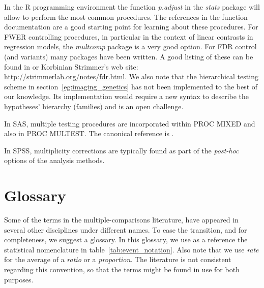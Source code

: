 \documentclass[review,12pt]{article}
\begin{document}
In the R programming environment \citep{r_development_core_team_r:_2011} the function \emph{p.adjust} in the \emph{stats} package will allow to perform the most common procedures. The references in the function documentation are a good starting point for learning about these procedures. 
For FWER controlling procedures, in particular in the context of linear contrasts in regression models, the \emph{multcomp} package is a very good option. 
For FDR control (and variants) many packages have been written. A good listing of these can be found in \citet{bretz_multiple_2010} or Korbinian Strimmer's web site: \url{http://strimmerlab.org/notes/fdr.html}. 
We also note that the hierarchical testing scheme in section~\ref{eg:imaging_genetics} has not been implemented to the best of our knowledge. Its implementation would require a new syntax to describe the hypotheses' hierarchy (families) and is an open challenge. 

In SAS, multiple testing procedures are incorporated within PROC MIXED and also in PROC MULTEST.  The canonical reference is \citet{westfall_multiple_2011}. 

In SPSS, multiplicity corrections are typically found as part of the \emph{post-hoc} options of the analysis methods.



\section{\label{sec:glossary} Glossary}
Some of the terms in the multiple-comparisons literature, have appeared in several other disciplines under different names. To ease the transition, and for completeness, we suggest a glossary. 
In this glossary, we use as a reference the statistical nomenclature in table~\ref{tab:event_notation}. Also note that we use \emph{rate} for the average of a \emph{ratio} or a \emph{proportion}. The literature is not consistent regarding this convention, so that the terms might be found in use for both purposes.
\end{document}
